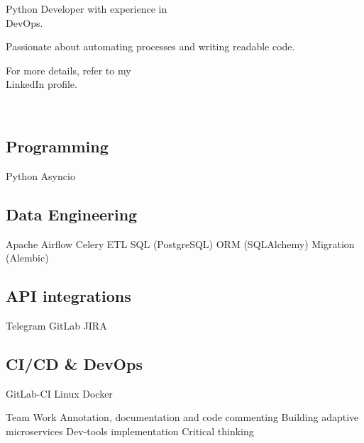\documentclass[a4paper]{MagicalCV}
\begin{document}
\lastupdated


\begin{minipage}[t]{0.33\textwidth} 


Python Developer with experience in \\DevOps.

Passionate about automating processes and writing readable code.

For more details, refer to my \\LinkedIn profile.
\sectionsep

\\



\sectionsep


\subsection{Programming}
Python \textbullet{}
Asyncio

\subsection{Data Engineering}
Apache Airflow \textbullet{} 
Celery \textbullet{}
ETL \textbullet{} 
SQL (PostgreSQL) \textbullet{} 
ORM (SQLAlchemy) \textbullet{} 
Migration (Alembic) 

\subsection{API integrations}
Telegram \textbullet{} 
GitLab \textbullet{} 
JIRA

\subsection{CI/CD \& DevOps}
GitLab-CI \textbullet{} 
Linux \textbullet{} 
Docker
\sectionsep


Team Work \textbullet{}
Annotation, documentation and code commenting \textbullet{}
Building adaptive microservices \textbullet{}
Dev-tools implementation \textbullet{}
Critical thinking
\sectionsep


\end{minipage}
\end{document}
